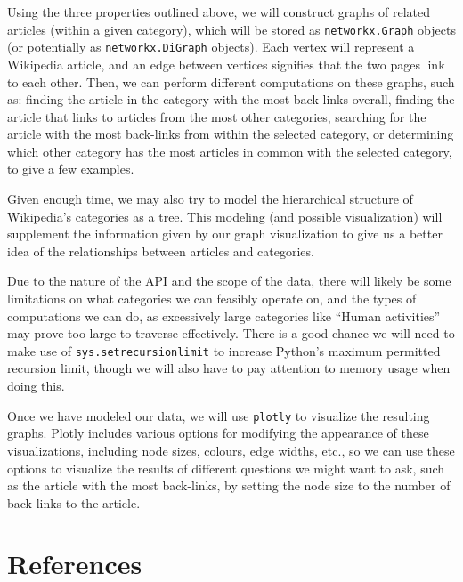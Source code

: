 \documentclass[fontsize=11pt]{article}
\begin{document}
Using the three properties outlined above, we will construct graphs of related articles (within a given category), which will be stored as \texttt{networkx.Graph} objects (or potentially as \texttt{networkx.DiGraph} objects). Each vertex will represent a Wikipedia article, and an edge between vertices signifies that the two pages link to each other. Then, we can perform different computations on these graphs, such as: finding the article in the category with the most back-links overall, finding the article that links to articles from the most other categories, searching for the article with the most back-links from within the selected category, or determining which other category has the most articles in common with the selected category, to give a few examples.

Given enough time, we may also try to model the hierarchical structure of Wikipedia's categories as a tree. This modeling (and possible visualization) will supplement the information given by our graph visualization to give us a better idea of the relationships between articles and categories.

Due to the nature of the API and the scope of the data, there will likely be some limitations on what categories we can feasibly operate on, and the types of computations we can do, as excessively large categories like ``Human activities'' may prove too large to traverse effectively. There is a good chance we will need to make use of \texttt{sys.setrecursionlimit} to increase Python's maximum permitted recursion limit, though we will also have to pay attention to memory usage when doing this.

Once we have modeled our data, we will use \texttt{plotly} to visualize the resulting graphs. Plotly includes various options for modifying the appearance of these visualizations, including node sizes, colours, edge widths, etc., so we can use these options to visualize the results of different questions we might want to ask, such as the article with the most back-links, by setting the node size to the number of back-links to the article.

\section*{References}

\end{document}

